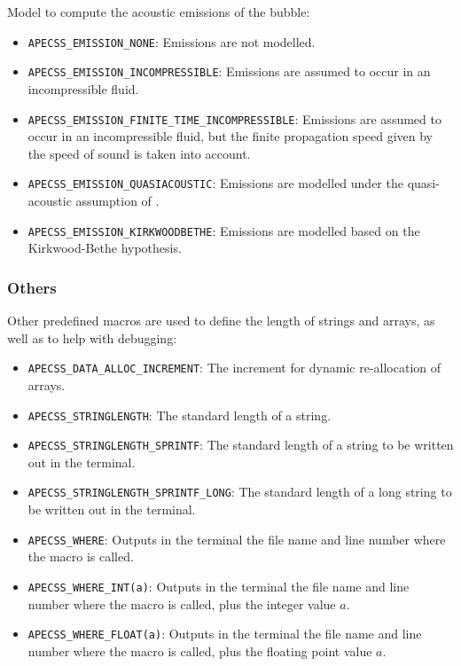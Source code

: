 Model to compute the acoustic emissions of the bubble:\vspace{-1em}
\begin{itemize}[noitemsep]
  \item {\tt APECSS\_EMISSION\_NONE}: Emissions are not modelled.
  \item {\tt APECSS\_EMISSION\_INCOMPRESSIBLE}: Emissions are assumed to occur in an incompressible fluid.
  \item {\tt APECSS\_EMISSION\_FINITE\_TIME\_INCOMPRESSIBLE}: Emissions are assumed to occur in an incompressible fluid, but the finite propagation speed given by the speed of sound is taken into account.
  \item {\tt APECSS\_EMISSION\_QUASIACOUSTIC}: Emissions are modelled under the quasi-acoustic assumption of \citet{Gilmore1952}.
  \item {\tt APECSS\_EMISSION\_KIRKWOODBETHE}: Emissions are modelled based on the Kirkwood-Bethe hypothesis.
\end{itemize}


\subsubsection{Others}

Other predefined macros are used to define the length of strings and arrays, as well as to help with debugging:\vspace{-1em}
\begin{itemize}[noitemsep]
  \item {\tt APECSS\_DATA\_ALLOC\_INCREMENT}: The increment for dynamic re-allocation of arrays.
  \item {\tt APECSS\_STRINGLENGTH}: The standard length of a string.
  \item {\tt APECSS\_STRINGLENGTH\_SPRINTF}: The standard length of a string to be written out in the terminal.
  \item {\tt APECSS\_STRINGLENGTH\_SPRINTF\_LONG}: The standard length of a long string to be  written out in the terminal.
  \item {\tt APECSS\_WHERE}: Outputs in the terminal the file name and line number where the macro is called.
  \item {\tt APECSS\_WHERE\_INT(a)}: Outputs in the terminal the file name and line number where the macro is called, plus the integer value $a$.
  \item {\tt APECSS\_WHERE\_FLOAT(a)}: Outputs in the terminal the file name and line number where the macro is called, plus the floating point value $a$.
\end{itemize}


